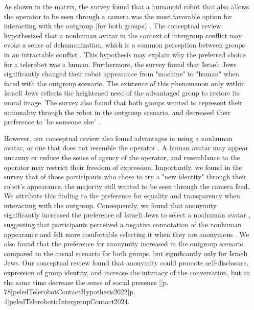 \documentclass[dissertation,math,vertlayout,pdfa,colorlinks]{aaltoseries}
\makeatletter
\newcommand{\citecomment}[2][]{\citen{#2}#1\citevar}
\newcommand{\citeone}[1]{\citecomment{#1}}
\newcommand{\citetwo}[2][]{\citecomment[,~#1]{#2}}
\newcommand{\citevar}{\@ifnextchar\bgroup{;~\citeone}{\@ifnextchar[{;~\citetwo}{]}}}
\newcommand{\citefirst}{\@ifnextchar\bgroup{\citeone}{\@ifnextchar[{\citetwo}{]}}}
\newcommand{\cites}{[\citefirst}
\makeatother
\begin{document}
As shown in the matrix, the survey found that a humanoid robot that also allows the operator to be seen through a camera was the most favorable option for interacting with the outgroup (for both groups) \cite[p. 11]{peledTeleroboticIntergroupContact2024}. The conceptual review hypothesized that a nonhuman avatar in the context of intergroup conflict may evoke a sense of dehumanization, which is a common perception between groups in an intractable conflict \cite[p. 79]{peledTelerobotContactHypothesis2022}. This hypothesis may explain why the preferred choice for a telerobot was a human. Furthermore, the survey found that Israeli Jews significantly changed their robot appearance from "machine" to "human" when faced with the outgroup scenario. The existence of this phenomenon only within Israeli Jews reflects the heightened need of the advantaged group to restore its moral image. The survey also found that both groups wanted to represent their nationality through the robot in the outgroup scenario, and decreased their preference to 'be someone else' \cite[p. 11]{peledTeleroboticIntergroupContact2024}.

However, our conceptual review also found advantages in using a nonhuman avatar, or one that does not resemble the operator \cite[p. 81]{peledTelerobotContactHypothesis2022}. A human avatar may appear uncanny or reduce the sense of agency of the operator, and resemblance to the operator may restrict their freedom of expression. Importantly, we found in the survey that of those participants who chose to try a "new identity" through their robot's appearance, the majority still wanted to be seen through the camera feed. We attribute this finding to the preference for equality and transparency when interacting with the outgroup. Consequently, we found that anonymity significantly increased the preference of Israeli Jews to select a nonhuman avatar \cite[p. 11]{peledTeleroboticIntergroupContact2024}, suggesting that participants perceived a negative connotation of the nonhuman appearance and felt more comfortable selecting it when they are anonymous \cite[p. 4]{peledTeleroboticIntergroupContact2024}. We also found that the preference for anonymity increased in the outgroup scenario compared to the casual scenario for both groups, but significantly only for Israeli Jews. Our conceptual review found that anonymity could promote self-disclosure, expression of group identity, and increase the intimacy of the conversation, but at the same time decrease the sense of social presence \cites[p. 78]{peledTelerobotContactHypothesis2022}[p. 4]{peledTeleroboticIntergroupContact2024}.
\end{document}
